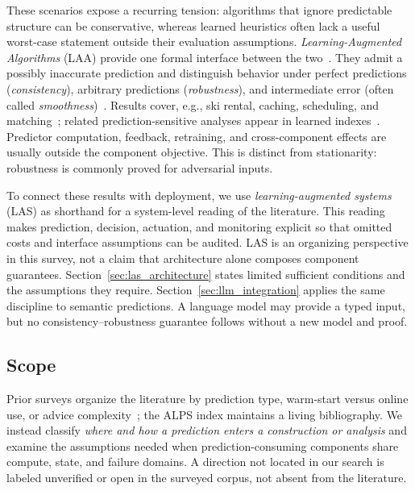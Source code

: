 \documentclass[acmsmall,screen,nonacm]{acmart}
\theoremstyle{acmdefinition}%
\begin{document}
These scenarios expose a recurring tension: algorithms that ignore predictable structure can be conservative, whereas learned heuristics often lack a useful worst-case statement outside their evaluation assumptions. \textit{Learning-Augmented Algorithms} (LAA) provide one formal interface between the two~\cite{mitzenmacher2021algorithms}. They admit a possibly inaccurate prediction and distinguish behavior under perfect predictions (\textit{consistency}), arbitrary predictions (\textit{robustness}), and intermediate error (often called \textit{smoothness})~\cite{purohit2018improving}. Results cover, e.g., ski rental, caching, scheduling, and matching~\cite{purohit2018improving,rohatgi2020near,lattanzi2020online,choo2025fractional}; related prediction-sensitive analyses appear in learned indexes~\cite{kraska2018case,ferragina2020pgm}. Predictor computation, feedback, retraining, and cross-component effects are usually outside the component objective. This is distinct from stationarity: robustness is commonly proved for adversarial inputs.

To connect these results with deployment, we use \textit{learning-augmented systems} (LAS) as shorthand for a system-level reading of the literature. This reading makes prediction, decision, actuation, and monitoring explicit so that omitted costs and interface assumptions can be audited. LAS is an organizing perspective in this survey, not a claim that architecture alone composes component guarantees. Section~\ref{sec:las_architecture} states limited sufficient conditions and the assumptions they require. Section~\ref{sec:llm_integration} applies the same discipline to semantic predictions. A language model may provide a typed input, but no consistency--robustness guarantee follows without a new model and proof.

\subsection{Scope}
\label{subsec:scope}

Prior surveys organize the literature by prediction type, warm-start versus online use, or advice complexity~\cite{mitzenmacher2021algorithms,mitzenmacher2022survey,boyar2017advice,boyar2023predictions}; the ALPS index maintains a living bibliography. We instead classify \emph{where and how a prediction enters a construction or analysis} and examine the assumptions needed when prediction-consuming components share compute, state, and failure domains. A direction not located in our search is labeled unverified or open in the surveyed corpus, not absent from the literature.
\end{document}
